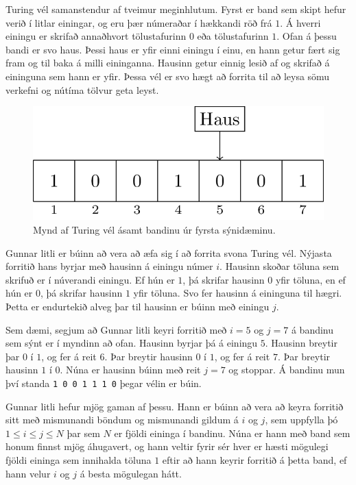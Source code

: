 
Turing vél samanstendur af tveimur meginhlutum. Fyrst er band sem skipt hefur
verið í litlar einingar, og eru þær númeraðar í hækkandi röð frá $1$. Á hverri
einingu er skrifað annaðhvort tölustafurinn $0$ eða tölustafurinn $1$. Ofan á
þessu bandi er svo haus. Þessi haus er yfir einni einingu í einu, en hann getur
fært sig fram og til baka á milli eininganna. Hausinn getur einnig lesið af og
skrifað á eininguna sem hann er yfir. Þessa vél er svo hægt að forrita til að
leysa sömu verkefni og nútíma tölvur geta leyst.

\begin{figure}[h]
    \centering
    \includegraphics[scale=0.35]{machine.png}
    \caption{Mynd af Turing vél ásamt bandinu úr fyrsta sýnidæminu.}
\end{figure}

Gunnar litli er búinn að vera að æfa sig í að forrita svona Turing vél. Nýjasta
forritið hans byrjar með hausinn á einingu númer $i$. Hausinn skoðar töluna sem
skrifuð er í núverandi einingu. Ef hún er $1$, þá skrifar hausinn $0$ yfir
töluna, en ef hún er $0$, þá skrifar hausinn $1$ yfir töluna. Svo fer hausinn á
eininguna til hægri. Þetta er endurtekið alveg þar til hausinn er búinn með
einingu $j$.

Sem dæmi, segjum að Gunnar litli keyri forritið með $i=5$ og $j=7$ á bandinu sem
sýnt er í myndinn að ofan. Hausinn byrjar þá á einingu $5$. Hausinn breytir þar
$0$ í $1$, og fer á reit $6$. Þar breytir hausinn $0$ í $1$, og fer á reit $7$.
Þar breytir hausinn $1$ í $0$. Núna er hausinn búinn með reit $j=7$ og stoppar.
Á bandinu mun því standa \texttt{1~0~0~1~1~1~0} þegar vélin er búin.

Gunnar litli hefur mjög gaman af þessu. Hann er búinn að vera að keyra
forritið sitt með mismunandi böndum og mismunandi gildum á $i$ og $j$, sem
uppfylla þó $1 \leq i \leq j \leq N$ þar sem $N$ er fjöldi eininga í bandinu.
Núna er hann með band sem honum finnst mjög áhugavert, og hann veltir fyrir sér
hver er hæsti mögulegi fjöldi eininga sem innihalda töluna $1$ eftir að hann
keyrir forritið á þetta band, ef hann velur $i$ og $j$ á besta mögulegan hátt.

